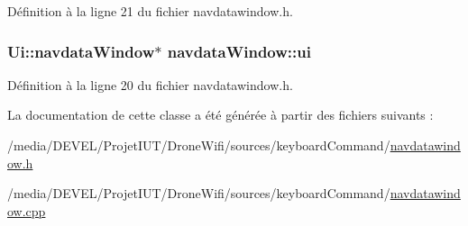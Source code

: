 Définition à la ligne 21 du fichier navdatawindow.\-h.

\hypertarget{classnavdata_window_aab1b5e5f1971600ce34830dbc9ad735c}{
\subsubsection[{ui}]{\setlength{\rightskip}{0pt plus 5cm}Ui\-::navdata\-Window$\ast$ navdata\-Window\-::ui\hspace{0.3cm}{\ttfamily [private]}}}\label{classnavdata_window_aab1b5e5f1971600ce34830dbc9ad735c}


Définition à la ligne 20 du fichier navdatawindow.\-h.



La documentation de cette classe a été générée à partir des fichiers suivants \-:\begin{DoxyCompactItemize}
\item 
/media/\-D\-E\-V\-E\-L/\-Projet\-I\-U\-T/\-Drone\-Wifi/sources/keyboard\-Command/\hyperlink{navdatawindow_8h}{navdatawindow.\-h}\item 
/media/\-D\-E\-V\-E\-L/\-Projet\-I\-U\-T/\-Drone\-Wifi/sources/keyboard\-Command/\hyperlink{navdatawindow_8cpp}{navdatawindow.\-cpp}\end{DoxyCompactItemize}
